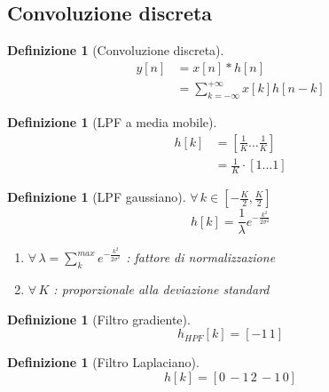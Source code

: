 \documentclass[a4paper,10pt]{article}
\theoremstyle{mystyle}
\newtheorem{definition}[theorem]{Definizione}
\begin{document}
\subsection{Convoluzione discreta}
\begin{definition}[Convoluzione discreta]
    \[
        \begin{aligned}
            y[n]
            &= x[n] * h[n] \\
            &= \sum_{k=-\infty}^{+\infty} x[k] h[n-k]
        \end{aligned}
    \]
\end{definition}

\begin{definition}[LPF a media mobile]
    \[
        \begin{aligned}
            h[k]
            &= \left[\frac{1}{K} \ldots \frac{1}{K}\right] \\
            &= \frac{1}{K} \cdot [1 \ldots 1]
        \end{aligned}
    \]
\end{definition}

\begin{definition}[LPF gaussiano]
    \(\forall \, k \in \left[-\frac{K}{2}, \frac{K}{2}\right]\)
    \[
            h[k] = \frac{1}{\lambda} e^{- \frac{k^2}{2 \sigma ^2}}
    \]
    \begin{enumerate}[label=\roman*.]
        \item \(\forall \,\lambda= \sum_{k}^{max} e^{- \frac{k^2}{2 \sigma ^2}}\) : fattore di normalizzazione
        \item \(\forall \,K\) : proporzionale alla deviazione standard
    \end{enumerate}
\end{definition}

\begin{definition}[Filtro gradiente]
    \[h_{HPF} [k] = [-1 \, 1]\]
\end{definition}

\begin{definition}[Filtro Laplaciano]
    \[h[k] = [0\,-1\,2\,-1\,0]\]
\end{definition}
\end{document}
